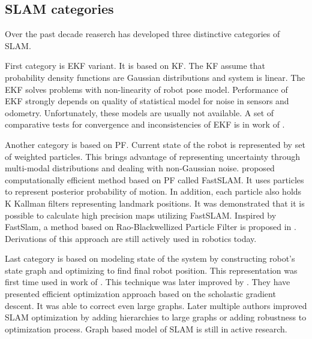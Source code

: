 \subsection{SLAM categories}
Over the past decade reaserch has developed three distinctive categories of \gls{SLAM}. 

First category is \gls{EKF} variant. It is based on \gls{KF}. The \gls{KF}  assume that probability density functions are Gaussian distributions and system is linear. The \gls{EKF} solves problems with non-linearity of robot pose model. Performance of \gls{EKF} strongly depends on quality of statistical model for noise in sensors and odometry. Unfortunately, these models are usually not available. A set of comparative tests for convergence and inconsistencies of \gls{EKF} is in work of \cite{EKF}.

Another category is based on \gls{PF}. Current state of the robot is represented by set of weighted particles. This brings advantage of representing uncertainty through multi-modal distributions and dealing with non-Gaussian noise. \cite{FastSlam} proposed computationally efficient method based on \gls{PF} called FastSLAM. It uses particles to represent posterior probability of motion. In addition, each particle also holds K Kallman filters representing landmark positions. It was demonstrated that it is possible to calculate high precision maps utilizing FastSLAM. Inspired by FastSlam, a method based on Rao-Blackwellized Particle Filter is proposed in \cite{Rao-PF}. Derivations of this approach are still actively used in robotics today. 

Last category is based on modeling state of the system by constructing robot's state graph and optimizing to find final robot position. This representation was first time used in work of \cite{LuMilios}. This technique was later improved by \cite{OlsonGS}. They have presented efficient optimization approach based on the scholastic gradient descent. It was able to correct even large graphs. Later multiple authors improved \gls{SLAM} optimization by adding hierarchies to large graphs or adding robustness to optimization process. Graph based model of SLAM is still in active research.       

